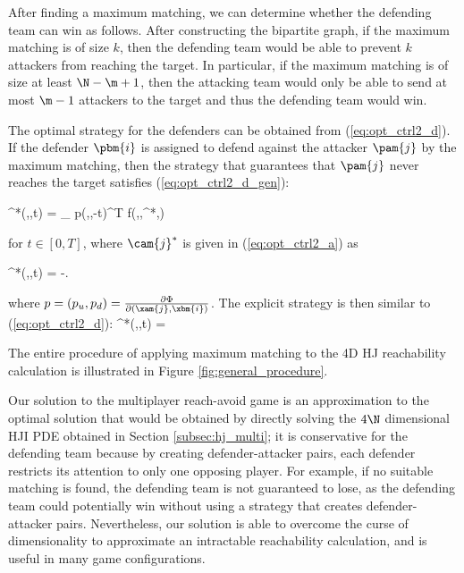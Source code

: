 After finding a maximum matching, we can determine whether the defending team can win as follows. After constructing the bipartite graph, if the maximum matching is of size $k$, then the defending team would be able to prevent $k$ attackers from reaching the target. In particular, if the maximum matching is of size at least $\N-\m+1$, then the attacking team would only be able to send at most $\m-1$ attackers to the target and thus the defending team would win. 

The optimal strategy for the defenders can be obtained from (\ref{eq:opt_ctrl2_d}). If the \ith defender $\pbm{i}$ is assigned to defend against the \jth attacker $\pam{j}$ by the maximum matching, then the strategy that guarantees that $\pam{j}$ never reaches the target satisfies (\ref{eq:opt_ctrl2_d_gen}): 

\bq \label{eq:opt_ctrl3_d_gen}
  ^*(,,t) = \arg \max_{ \in {}} p(,,-t)^T f(,,^*,)
\eq

\noindent for $t\in [0,T]$, where $\cam{j}^*$ is given in (\ref{eq:opt_ctrl2_a}) as

\bq \label{eq:opt_ctrl2_a}
^*(,,t) = -\vela {}.
\eq

\noindent where $p = (p_u, p_d) = \frac{\partial \Phi}{\partial (\xam{j},\xbm{i})}$. The explicit strategy is then similar to (\ref{eq:opt_ctrl2_d}):
\bq \label{eq:opt_ctrl3_d}
\cb^*(,,t) = \velb {}
\eq

The entire procedure of applying maximum matching to the 4D HJ reachability calculation is illustrated in Figure \ref{fig:general_procedure}.

Our solution to the multiplayer reach-avoid game is an approximation to the optimal solution that would be obtained by directly solving the $4\N$ dimensional HJI PDE obtained in Section \ref{subsec:hj_multi}; it is conservative for the defending team because by creating defender-attacker pairs, each defender restricts its attention to only one opposing player. For example, if no suitable matching is found, the defending team is not guaranteed to lose, as the defending team could potentially win without using a strategy that creates defender-attacker pairs. Nevertheless, our solution is able to overcome the curse of dimensionality to approximate an intractable reachability calculation, and is useful in many game configurations.

